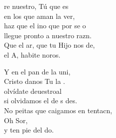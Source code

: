 \begin{cancion}%
	re nuestro, Tú que es\\
	en los que aman la ver,\\
	haz que el ino que por  se o\\
	llegue pronto a nuestro razn.\\
	Que el ar, que tu Hijo nos de,\\
	el A, habite noros.\jump\\
	\begin{chorus}%
		Y en el pan de la uni,\\
		Cristo danos Tu la .\\
		olvídate deuestroal\\
		si olvidamos el de s des.\\
		No peitas que caigamos en tentacn,\\
		Oh Sor,\\
		y ten pie del do.\jump\\
	\end{chorus}%
\end{cancion}%
